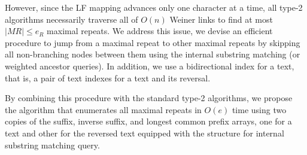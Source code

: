 However, since the LF mapping advances only one character at a time, all type-2 algorithms necessarily traverse all  of $O(n)$ Weiner links to find at most $|MR| \le e_R$ maximal repeats. 
We address this issue, we devise an efficient procedure to jump from a maximal repeat to other maximal repeats by skipping all non-branching nodes between them using the internal substring matching (or weighted ancestor queries). In addition, we use a bidirectional index for a text, that is, a pair of text indexes for a text and its reversal. 

By combining this procedure with the standard type-2 algorithms, we propose the algorithm that enumerates all maximal repeats in $O(e)$ time using two copies of the suffix, inverse suffix, and longest common prefix arrays, one for a text and other for the reversed text equipped with the structure for internal substring matching query. 




